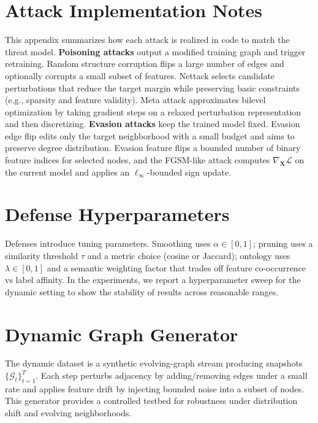 \documentclass[conference]{IEEEtran}
\begin{document}
\section{Attack Implementation Notes}
This appendix summarizes how each attack is realized in code to match the threat model.
\textbf{Poisoning attacks} output a modified training graph and trigger retraining. Random structure corruption flips a large number of edges and optionally corrupts a small subset of features. Nettack selects candidate perturbations that reduce the target margin while preserving basic constraints (e.g., sparsity and feature validity). Meta attack approximates bilevel optimization by taking gradient steps on a relaxed perturbation representation and then discretizing.
\textbf{Evasion attacks} keep the trained model fixed. Evasion edge flip edits only the target neighborhood with a small budget and aims to preserve degree distribution. Evasion feature flips a bounded number of binary feature indices for selected nodes, and the FGSM-like attack computes $\nabla_{\mathbf{X}}\mathcal{L}$ on the current model and applies an $\ell_\infty$-bounded sign update.

\section{Defense Hyperparameters}
Defenses introduce tuning parameters. Smoothing uses $\alpha\in[0,1]$; pruning uses a similarity threshold $\tau$ and a metric choice (cosine or Jaccard); ontology uses $\lambda\in[0,1]$ and a semantic weighting factor that trades off feature co-occurrence vs label affinity. In the experiments, we report a hyperparameter sweep for the dynamic setting to show the stability of results across reasonable ranges.

\section{Dynamic Graph Generator}
The dynamic dataset is a synthetic evolving-graph stream producing snapshots $\{\mathcal{G}_t\}_{t=1}^T$. Each step perturbs adjacency by adding/removing edges under a small rate and applies feature drift by injecting bounded noise into a subset of nodes. This generator provides a controlled testbed for robustness under distribution shift and evolving neighborhoods.



\end{document}

